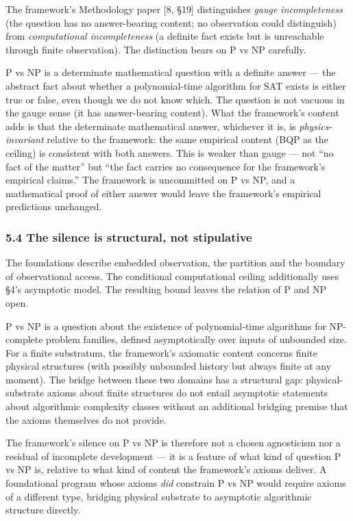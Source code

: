 \documentclass[
]{article}
\begin{document}
The framework's Methodology paper {[}8, §19{]} distinguishes \emph{gauge
incompleteness} (the question has no answer-bearing content; no
observation could distinguish) from \emph{computational incompleteness}
(a definite fact exists but is unreachable through finite observation).
The distinction bears on P vs NP carefully.

P vs NP is a determinate mathematical question with a definite answer
--- the abstract fact about whether a polynomial-time algorithm for SAT
exists is either true or false, even though we do not know which. The
question is not vacuous in the gauge sense (it has answer-bearing
content). What the framework's content adds is that the determinate
mathematical answer, whichever it is, is \emph{physics-invariant}
relative to the framework: the same empirical content (BQP as the
ceiling) is consistent with both answers. This is weaker than gauge ---
not ``no fact of the matter'' but ``the fact carries no consequence for
the framework's empirical claims.'' The framework is uncommitted on P vs
NP, and a mathematical proof of either answer would leave the
framework's empirical predictions unchanged.

\hypertarget{the-silence-is-structural-not-stipulative}{%
\subsubsection{5.4 The silence is structural, not
stipulative}\label{the-silence-is-structural-not-stipulative}}

The foundations describe embedded observation, the partition and the
boundary of observational access. The conditional computational ceiling
additionally uses §4's asymptotic model. The resulting bound leaves the
relation of P and NP open.

P vs NP is a question about the existence of polynomial-time algorithms
for NP-complete problem families, defined asymptotically over inputs of
unbounded size. For a finite substratum, the framework's axiomatic
content concerns finite physical structures (with possibly unbounded
history but always finite at any moment). The bridge between these two
domains has a structural gap: physical-substrate axioms about finite
structures do not entail asymptotic statements about algorithmic
complexity classes without an additional bridging premise that the
axioms themselves do not provide.

The framework's silence on P vs NP is therefore not a chosen agnosticism
nor a residual of incomplete development --- it is a feature of what
kind of question P vs NP is, relative to what kind of content the
framework's axioms deliver. A foundational program whose axioms
\emph{did} constrain P vs NP would require axioms of a different type,
bridging physical substrate to asymptotic algorithmic structure
directly.
\end{document}
